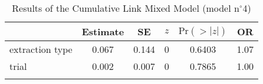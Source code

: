 \begin{table}
\begin{tabular}{l S[table-format=1.3] S[table-format=1.3] c S[table-format=1.4] S[table-format=1.2]}
  \lsptoprule
                 & {Estimate} & {SE} & {$z$} & {$\text{Pr}(>|z|)$} & {OR} \\ 
  \midrule
  extraction type & 0.067 & 0.144 & 0 & 0.6403 & 1.07 \\ 
  trial           & 0.002 & 0.007 & 0 & 0.7865 & 1.00 \\ 
 \lspbottomrule
\end{tabular}
\caption{Results of the Cumulative Link Mixed Model (model n$^{\circ}$4)}
\label{tab:exp12-m4}
\end{table}

